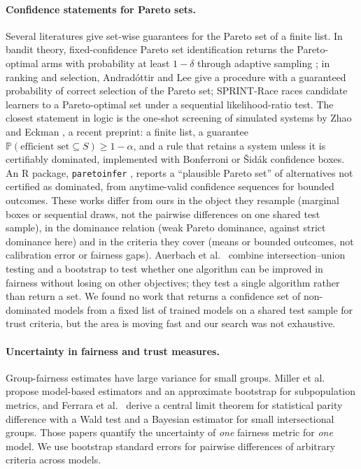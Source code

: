 \documentclass[pdflatex,sn-mathphys-num,iicol]{sn-jnl}
\theoremstyle{thmstyleone}
\theoremstyle{thmstyletwo}
\renewcommand{\Pr}{\mathbb{P}}
\begin{document}
\paragraph{Confidence statements for Pareto sets.} Several literatures give set-wise guarantees for the Pareto set of a finite list. In bandit theory, fixed-confidence Pareto set identification returns the Pareto-optimal arms with probability at least $1-\delta$ through adaptive sampling \cite{auer2016,kone2023,crepon2024}; in ranking and selection, Andrad\'ottir and Lee \cite{andradottir2021} give a procedure with a guaranteed probability of correct selection of the Pareto set; SPRINT-Race \cite{zhang2018sprint} races candidate learners to a Pareto-optimal set under a sequential likelihood-ratio test. The closest statement in logic is the one-shot screening of simulated systems by Zhao and Eckman \cite{zhao2026}, a recent preprint: a finite list, a guarantee $\Pr(\text{efficient set}\subseteq S)\ge1-\alpha$, and a rule that retains a system unless it is certifiably dominated, implemented with Bonferroni or \v{S}id\'ak confidence boxes. An R package, \texttt{paretoinfer} \cite{paretoinfer}, reports a ``plausible Pareto set'' of alternatives not certified as dominated, from anytime-valid confidence sequences for bounded outcomes. These works differ from ours in the object they resample (marginal boxes or sequential draws, not the pairwise differences on one shared test sample), in the dominance relation (weak Pareto dominance, against strict dominance here) and in the criteria they cover (means or bounded outcomes, not calibration error or fairness gaps). Auerbach et al.\ \cite{auerbach2024} combine intersection--union testing and a bootstrap to test whether one algorithm can be improved in fairness without losing on other objectives; they test a single algorithm rather than return a set. We found no work that returns a confidence set of non-dominated models from a fixed list of trained models on a shared test sample for trust criteria, but the area is moving fast and our search was not exhaustive.

\paragraph{Uncertainty in fairness and trust measures.} Group-fairness estimates have large variance for small groups. Miller et al.\ \cite{miller2021} propose model-based estimators and an approximate bootstrap for subpopulation metrics, and Ferrara et al.\ \cite{ferrara2025} derive a central limit theorem for statistical parity difference with a Wald test and a Bayesian estimator for small intersectional groups. Those papers quantify the uncertainty of \emph{one} fairness metric for \emph{one} model. We use bootstrap standard errors for pairwise differences of arbitrary criteria across models.
\end{document}
